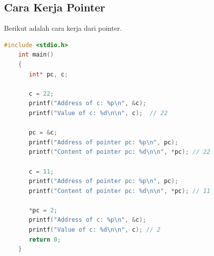 \subsection{Cara Kerja Pointer}
Berikut adalah cara kerja dari pointer.
\begin{lstlisting}[language=c, caption={Contoh Program Pointer}]
    #include <stdio.h>
    int main()
    {
       int* pc, c;
       
       c = 22;
       printf("Address of c: %p\n", &c);
       printf("Value of c: %d\n\n", c);  // 22
       
       pc = &c;
       printf("Address of pointer pc: %p\n", pc);
       printf("Content of pointer pc: %d\n\n", *pc); // 22
       
       c = 11;
       printf("Address of pointer pc: %p\n", pc);
       printf("Content of pointer pc: %d\n\n", *pc); // 11
       
       *pc = 2;
       printf("Address of c: %p\n", &c);
       printf("Value of c: %d\n\n", c); // 2
       return 0;
    }
\end{lstlisting}

